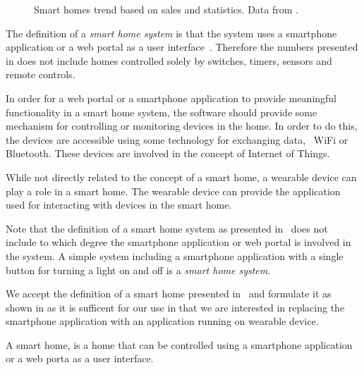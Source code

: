 \begin{figure}[!hbt]
  \centering
  
  \caption{Smart homes trend based on sales and statistics. Data from \protect\cite{SMARTHOMETREND}.}
  \label{fig:smarthomestrend}
\end{figure}

The definition of a \emph{smart home system} is  that the system uses a smartphone application or a web portal as a user interface~\cite{SMARTHOMETREND}. Therefore the numbers presented in  does not include homes controlled solely by switches, timers, sensors and remote controls.

In order for a web portal or a smartphone application to provide meaningful functionality in a smart home system, the software should provide some mechanism for controlling or monitoring devices in the home. In order to do this, the devices are accessible using some technology for exchanging data, \eg~WiFi or Bluetooth. These devices are involved in the concept of Internet of Things. 

While not directly related to the concept of a smart home, a wearable device can play a role in a smart home. The wearable device can provide the application used for interacting with devices in the smart home.

Note that the definition of a smart home system as presented in~\cite{SMARTHOMETREND} does not include to which degree the smartphone application or web portal is involved in the system. A simple system including a smartphone application with a single button for turning a light on and off is a \emph{smart home system}.

We accept the definition of a smart home presented in~\cite{SMARTHOMETREND} and formulate it as shown in  as it is sufficent for our use in that we are interested in replacing the smartphone application with an application running on wearable device.

\begin{definition}
\label{def:smarthome}
A smart home, is a home that can be controlled using a smartphone application or a web porta as a user interface.
\end{definition}

